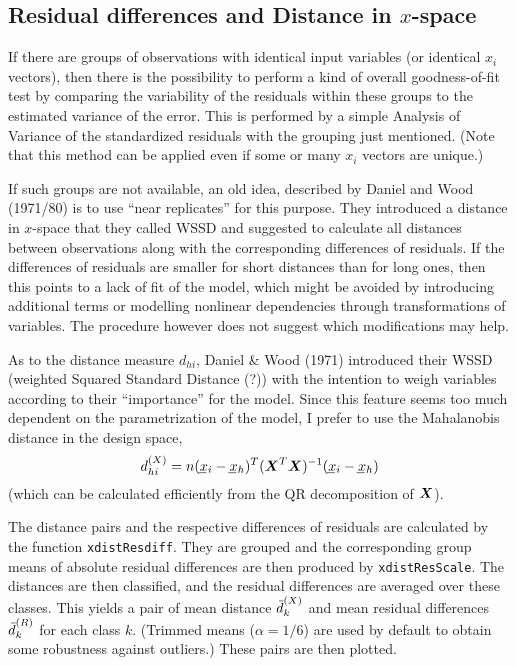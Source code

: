 \documentclass[11pt]{article}
\providecommand{\vc}[1]{\kern-1pt\underline{\kern1pt#1\kern-1pt}\kern1pt}
\providecommand{\bmath}[1]{\relax\ifmmode{\mbox{\boldmath $#1$}}%
  \else{\boldmath $#1$}\fi}
\providecommand{\mx}[1]{\bmath#1}
\providecommand{\sups}[1]{^{(#1)}}
\providecommand{\wb}[1]{{}\if Y#1\overline{Y}\else
\kern0.2em\overline{\kern-0.2em#1}\fi}
\providecommand{\code}[1]{\texttt{#1}}
\begin{document}
\subsection{Residual differences and Distance in $x$-space}
If there are groups of observations with identical input variables
(or identical $x_i$ vectors), then there is the possibility to perform a kind
of overall goodness-of-fit test by comparing the variability of the
residuals within these groups to the estimated variance of the error.
This is performed by a simple Analysis of Variance of the standardized 
residuals with the grouping just mentioned. 
(Note that this method can be applied even if some or many $x_i$ vectors 
are unique.)

If such groups are not available, an old idea, described by
Daniel and Wood (1971/80) is to use ``near replicates'' for this purpose. 
They introduced a distance in $x$-space that they called WSSD and suggested
to calculate all distances between observations along with the
corresponding differences of residuals. If the differences of residuals
are smaller for short distances than for long ones, then this points to a
lack of fit of the model, which might be avoided by introducing 
additional terms or modelling nonlinear dependencies through
transformations of variables. The procedure however does not suggest
which modifications may help.

As to the distance measure $d_{hi}$, %
Daniel \& Wood (1971) introduced their 
WSSD (weighted Squared Standard Distance (?))
with the intention to weigh variables according to their ``importance'' for
the model. Since this feature seems too much dependent on the
parametrization of the model, I prefer to use the Mahalanobis distance in
the design space, 
$$
  d\sups X_{hi} = n(\vc x_i-\vc x_h)^T (\mx X^T\mx X)^{-1} (\vc x_i-\vc x_h)
$$
(which can be calculated efficiently from the QR decomposition of $\mx X$).

The distance pairs and the respective differences of residuals are
calculated by the function \code{xdistResdiff}. They are grouped and the
corresponding group means of absolute residual differences are then
produced by \code{xdistResScale}. 
The distances are then classified, and the residual differences
are averaged over these classes. This yields a pair of mean distance 
$\wb d\sups X_k$ and mean residual differences $\wb d\sups R_k$ 
for each class $k$. 
(Trimmed means ($\alpha=1/6$) are used by default to obtain some
robustness against outliers.)
These pairs are then plotted.
\end{document}
